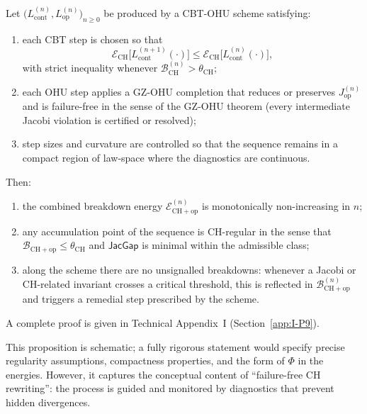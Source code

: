 \documentclass[11pt]{book}
\theoremstyle{plain}
\theoremstyle{definition}
\begin{document}
\begin{proposition}
  Let $\bigl(L_{\mathrm{cont}}^{(n)},L_{\mathrm{op}}^{(n)}\bigr)_{n\ge0}$
  be produced by a CBT-OHU scheme satisfying:
  \begin{enumerate}[label=\roman*)]
    \item each CBT step is chosen so that
          \[
            \mathcal{E}_{\mathrm{CH}}
              \bigl[L_{\mathrm{cont}}^{(n+1)}(\cdot)\bigr]
            \le
            \mathcal{E}_{\mathrm{CH}}
              \bigl[L_{\mathrm{cont}}^{(n)}(\cdot)\bigr],
          \]
          with strict inequality whenever
          $\mathcal{B}_{\mathrm{CH}}^{(n)}>\theta_{\mathrm{CH}}$;
    \item each OHU step applies a GZ-OHU completion that reduces or
          preserves $J_{\mathrm{op}}^{(n)}$ and is failure-free in the
          sense of the GZ-OHU theorem (every intermediate Jacobi
          violation is certified or resolved);
    \item step sizes and curvature are controlled so that the sequence
          remains in a compact region of law-space where the diagnostics
          are continuous.
  \end{enumerate}
  Then:
  \begin{enumerate}[label=\alph*)]
    \item the combined breakdown energy
          $\mathcal{E}_{\mathrm{CH+op}}^{(n)}$ is monotonically
          non-increasing in $n$;
    \item any accumulation point of the sequence is CH-regular in the
          sense that $\mathcal{B}_{\mathrm{CH+op}}\le\theta_{\mathrm{CH}}$
          and $\mathsf{JacGap}$ is minimal within the admissible class;
    \item along the scheme there are no unsignalled breakdowns:
          whenever a Jacobi or CH-related invariant crosses a critical
          threshold, this is reflected in
          $\mathcal{B}_{\mathrm{CH+op}}^{(n)}$ and triggers a remedial
          step prescribed by the scheme.
  \end{enumerate}
  A complete proof is given in Technical Appendix~I
  (Section~\ref{app:I-P9}).
\end{proposition}

This proposition is schematic; a fully rigorous statement would specify
precise regularity assumptions, compactness properties, and the form of
$\Phi$ in the energies. However, it captures the conceptual content of
“failure-free CH rewriting”: the process is guided and monitored by
diagnostics that prevent hidden divergences.
\end{document}
